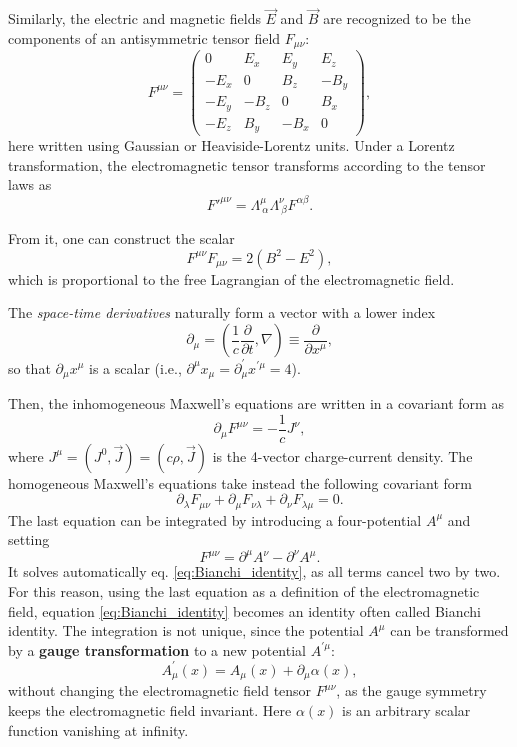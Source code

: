 Similarly, the electric and magnetic fields $\vec{E}$ and $\vec{B}$ are recognized to be the components of an antisymmetric tensor field $F_{\mu\nu}$:
\[
    F^{\mu\nu} =
    \begin{pmatrix}
        0    & E_x  & E_y  & E_z  \\
        -E_x & 0    & B_z  & -B_y \\
        -E_y & -B_z & 0    & B_x  \\
        -E_z & B_y  & -B_x & 0
    \end{pmatrix},
\]
here written using Gaussian or Heaviside-Lorentz units. Under a Lorentz transformation, the electromagnetic tensor transforms according to the tensor laws as
\[
    F'^{\mu\nu} = \Lambda^\mu_{\ \alpha} \Lambda^\nu_{\ \beta} F^{\alpha\beta}.
\]

From it, one can construct the scalar
\[
    F^{\mu\nu} F_{\mu\nu} = 2 (B^2 - E^2),
\]
which is proportional to the free Lagrangian of the electromagnetic field.

The \textit{space-time derivatives} naturally form a vector with a lower index
\[
    \partial_\mu = \left( \frac{1}{c} \frac{\partial}{\partial t}, \nabla \right) \equiv \frac{\partial}{\partial x^\mu},
\]
so that $\partial_\mu x^\mu$ is a scalar (i.e., $\partial^\mu x_\mu = \partial^{\prime}_\mu x^{\prime \mu} = 4$).

Then, the inhomogeneous Maxwell's equations are written in a covariant form as
\[
    \partial_\mu F^{\mu\nu} = -\frac{1}{c} J^\nu,
\]
where $J^\mu = (J^0, \vec{J}) = (c \rho, \vec{J})$ is the 4-vector charge-current density. The homogeneous Maxwell's equations take instead the following covariant form
\begin{equation}
    \partial_\lambda F_{\mu\nu} + \partial_\mu F_{\nu\lambda} + \partial_\nu F_{\lambda\mu} = 0.
    \label{eq:Bianchi_identity}
\end{equation}
The last equation can be integrated by introducing a four-potential \(A^{\mu} \) and setting
\[
    F^{\mu \nu} = \partial^\mu A^\nu - \partial^\nu A^\mu.
\]
It solves automatically eq. \eqref{eq:Bianchi_identity}, as all terms cancel two by two. For this reason, using the last equation as a definition of the electromagnetic field, equation \eqref{eq:Bianchi_identity} becomes an identity often called Bianchi identity. The integration is not unique, since the potential \(A^{\mu}\) can be transformed by a \textbf{gauge transformation} to a new potential \(A^{\prime \mu}\):
\[
    A^{\prime}_\mu (x) = A_\mu (x) + \partial_\mu \alpha(x),
\]
without changing the electromagnetic field tensor \(F^{\mu \nu}\), as the gauge symmetry keeps the electromagnetic field invariant. Here \(\alpha(x)\) is an arbitrary scalar function vanishing at infinity.

